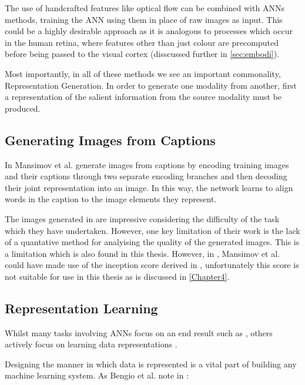 The use of handcrafted features like optical flow can be combined with \acp{ANN} methods, training the \ac{ANN} using them in place of raw images as input. This could be a highly desirable approach as it is analogous to processes which occur in the human retina, where features other than just colour are precomputed before being passed to the visual cortex (disscussed further in \autoref{sec:embodi}).

Most importantly, in all of these methods we see an important commonality, Representation Generation. In order to generate one modality from another, first a representation of the salient information from the source modality must be produced.

\subsection{Generating Images from Captions}
In \cite{mansimov2015generating} Mansimov et al. generate images from captions by encoding training images and their captions through two separate encoding branches and then decoding their joint representation into an image. In this way, the network learns to align words in the caption to the image elements they represent.

The images generated in \cite{mansimov2015generating} are impressive considering the difficulty of the task which they have undertaken. However, one key limitation of their work is the lack of a quantative method for analyising the quality of the generated images. This is a limitation which is also found in this thesis. However, in \cite{mansimov2015generating}, Mansimov et al. could have made use of the inception score derived in \cite{zhang2017stackgan}, unfortunately this score is not suitable for use in this thesis as is discussed in \autoref{Chapter4}.

\subsection{Representation Learning}

Whilst many tasks involving \acp{ANN} focus on an end result such as \cite{krizhevsky2012imagenet}, others actively focus on learning data representations \cite{radford2015unsupervised, silberer2014learning, wavenet, vincent2010stacked, mikolov2013distributed, mikolov2013efficient, mikolov2013linguistic, feng2010visual, eslami2018neural, donahue2019large}.

Designing the manner in which data is represented is a vital part of building any machine learning system. As Bengio et al. note in \cite{repRev}:

